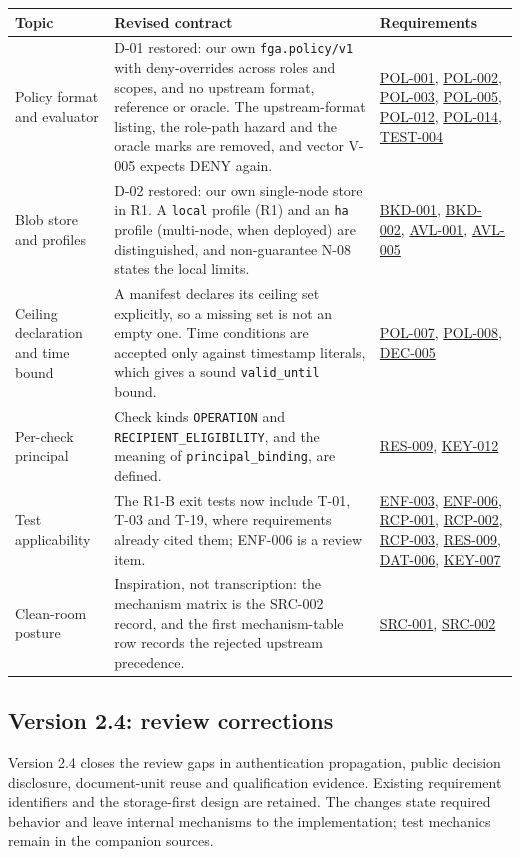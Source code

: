 \documentclass[11pt,a4paper]{article}
\newcommand{\code}[1]{{\small\nolinkurl{#1}}}
\newcommand{\rr}[1]{\hyperlink{req:#1}{#1}}
\begin{document}
\begin{longtable}{@{}P{0.23\textwidth}P{0.48\textwidth}P{0.19\textwidth}@{}}
\toprule Topic & Revised contract & Requirements\\\midrule\endhead
Policy format and evaluator & D-01 restored: our own \code{fga.policy/v1} with deny-overrides across roles and scopes, and no upstream format, reference or oracle. The upstream-format listing, the role-path hazard and the oracle marks are removed, and vector V-005 expects DENY again. & \rr{POL-001}, \rr{POL-002}, \rr{POL-003}, \rr{POL-005}, \rr{POL-012}, \rr{POL-014}, \rr{TEST-004}\\
Blob store and profiles & D-02 restored: our own single-node store in R1. A \code{local} profile (R1) and an \code{ha} profile (multi-node, when deployed) are distinguished, and non-guarantee N-08 states the local limits. & \rr{BKD-001}, \rr{BKD-002}, \rr{AVL-001}, \rr{AVL-005}\\
Ceiling declaration and time bound & A manifest declares its ceiling set explicitly, so a missing set is not an empty one. Time conditions are accepted only against timestamp literals, which gives a sound \code{valid_until} bound. & \rr{POL-007}, \rr{POL-008}, \rr{DEC-005}\\
Per-check principal & Check kinds \code{OPERATION} and \code{RECIPIENT_ELIGIBILITY}, and the meaning of \code{principal_binding}, are defined. & \rr{RES-009}, \rr{KEY-012}\\
Test applicability & The R1-B exit tests now include T-01, T-03 and T-19, where requirements already cited them; ENF-006 is a review item. & \rr{ENF-003}, \rr{ENF-006}, \rr{RCP-001}, \rr{RCP-002}, \rr{RCP-003}, \rr{RES-009}, \rr{DAT-006}, \rr{KEY-007}\\
Clean-room posture & Inspiration, not transcription: the mechanism matrix is the SRC-002 record, and the first mechanism-table row records the rejected upstream precedence. & \rr{SRC-001}, \rr{SRC-002}\\
\bottomrule
\end{longtable}


\subsection{Version 2.4: review corrections}
Version 2.4 closes the review gaps in authentication propagation, public decision disclosure, document-unit reuse and qualification evidence. Existing requirement identifiers and the storage-first design are retained. The changes state required behavior and leave internal mechanisms to the implementation; test mechanics remain in the companion sources.
\end{document}
